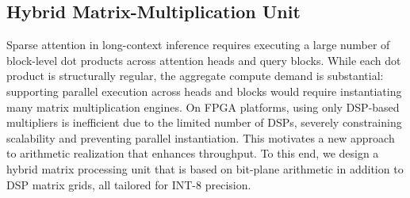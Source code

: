 \documentclass[conference]{IEEEtran}
\begin{document}



\subsection{Hybrid Matrix-Multiplication Unit}
\label{Sec_MPU}

Sparse attention in long-context inference requires executing a large number of block-level dot products across attention heads and query blocks. While each dot product is structurally regular, the aggregate compute demand is substantial: supporting parallel execution across heads and blocks would require instantiating many matrix multiplication engines. On FPGA platforms, using only DSP-based multipliers is inefficient due to the limited number of DSPs, severely constraining scalability and preventing parallel instantiation. This motivates a new approach to arithmetic realization that enhances throughput. To this end, we design a hybrid matrix processing unit that is based on bit-plane arithmetic in addition to DSP matrix grids, all tailored for INT-8 precision.
\end{document}
